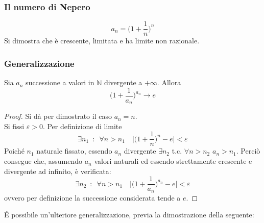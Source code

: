 \documentclass[10pt, oneside]{book}
\theoremstyle{plain}
\begin{document}
\subsubsection*{Il numero di Nepero}
\[a_n = \bigg(1 + \frac{1}{n}\bigg)^n\]
Si dimostra che è crescente, limitata e ha limite non razionale.

\subsubsection*{Generalizzazione}
\begin{prop}
    Sia $a_n$ successione a valori in $\mathbb{N}$ divergente a $+\infty$. Allora
    \[\bigg(1 + \frac{1}{a_n}\bigg)^{a_n} \longrightarrow e\]
\end{prop}
\begin{proof}
    Si dà per dimostrato il caso $a_n = n$.
    \\Si fissi $\varepsilon > 0$. Per definizione di limite \[\exists n_1 \enspace : \enspace \forall n > n_1 \quad \bigg| \bigg(1 + \frac{1}{n}\bigg)^n - e\bigg| < \varepsilon\]
    Poiché $n_1$ naturale fissato, essendo $a_n$ divergente $\exists n_2$ t.c. $\forall n > n_2$ $a_n > n_1$. Perciò consegue che, assumendo $a_n$ valori naturali ed essendo strettamente crescente e divergente ad infinito, è verificata:
    \[\exists n_2 \enspace : \enspace \forall n > n_1 \quad \bigg| \bigg(1 + \frac{1}{a_n}\bigg)^{a_n} - e\bigg| < \varepsilon\]
    ovvero per definizione la successione considerata tende a $e$.
\end{proof}

\'E possibile un'ulteriore generalizzazione, previa la dimostrazione della seguente:
\end{document}
